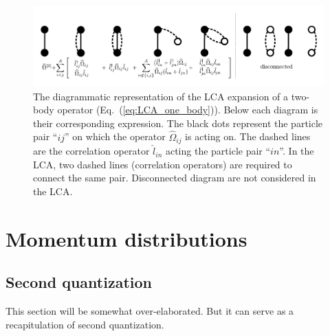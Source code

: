 \documentclass[10pt]{article}
\begin{document}
%
\begin{figure}
\centering
\includegraphics[scale=0.75]{figures/two_body_with_eq.pdf}
\caption{
The diagrammatic representation of the LCA expansion of a two-body operator (Eq.~(\ref{eq:LCA_one_body})).
Below each diagram is their corresponding expression.
The black dots represent the particle pair ``$ij$'' on which the operator $\widehat{\Omega}_{ij}$ is acting on.
The dashed lines are the correlation operator $\hat{l}_{in}$ acting the particle pair ``$in$''.
In the LCA, two dashed lines (correlation operators) are required to connect the same pair.
Disconnected diagram are not considered in the LCA.
} 
\label{fig:LCA_two_body_diagram}
\end{figure}
\section{Momentum distributions}
\subsection{Second quantization}
This section will be somewhat over-elaborated. But it can serve as a recapitulation of second quantization.
\end{document}
